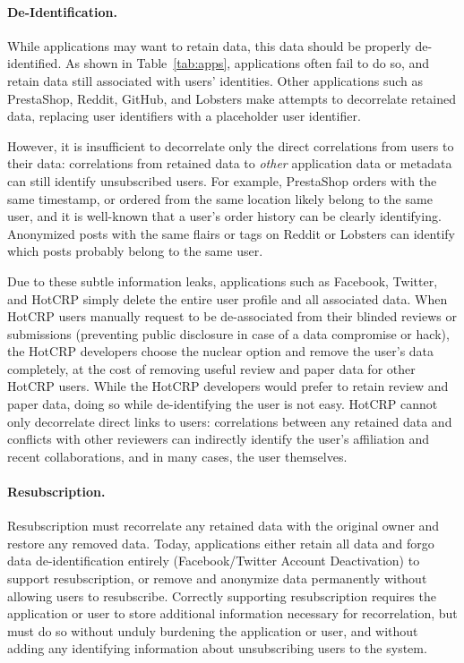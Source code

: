 \paragraph{De-Identification.}
While applications may want to retain data, this data should be properly de-identified. As shown in
Table~\ref{tab:apps}, applications often fail to do so, and retain data still associated
with users' identities. Other applications such as PrestaShop, Reddit, GitHub, and Lobsters make
attempts to decorrelate retained data, replacing user identifiers with a placeholder user identifier. 

However, it is insufficient to decorrelate only the direct correlations from users to their data:
correlations from retained data to \emph{other} application data or metadata can still identify
unsubscribed users. For example, PrestaShop orders with the same timestamp, or ordered from the same
location likely belong to the same user, and it is well-known that a user's order history can be
clearly identifying. Anonymized posts with the same flairs or tags on Reddit or Lobsters can
identify which posts probably belong to the same user. 

Due to these subtle information leaks, applications such as Facebook, Twitter, and HotCRP
simply delete the entire user profile and all associated data. When HotCRP users manually request to
be de-associated from their blinded reviews or submissions (preventing public disclosure in case of
a data compromise or hack), the HotCRP developers choose the nuclear option and remove the user's
data completely, at the cost of removing useful review and paper data for other HotCRP users.  While
the HotCRP developers would prefer to retain review and paper data, doing so while de-identifying
the user is not easy. HotCRP cannot only decorrelate direct links to users: 
correlations between any retained data and conflicts with other reviewers can indirectly identify the user's
affiliation and recent collaborations, and in many cases, the user themselves.

\paragraph{Resubscription.}
Resubscription must recorrelate any retained data with the original owner and restore any removed
data. Today, applications either retain all data and forgo data de-identification entirely
(Facebook/Twitter Account Deactivation) to support resubscription, or remove and anonymize data
permanently without allowing users to resubscribe. Correctly supporting resubscription requires the
application or user to store additional information necessary for recorrelation, but must do so
without unduly burdening the application or user, and without adding any identifying information
about unsubscribing users to the system.

